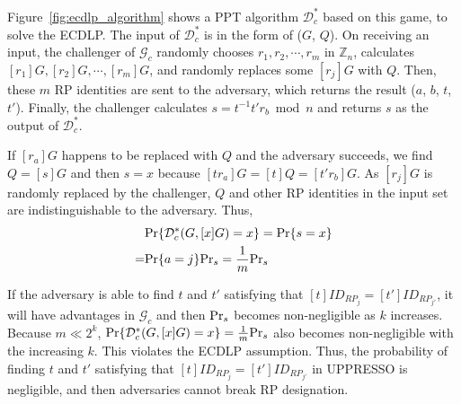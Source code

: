 Figure~\ref{fig:ecdlp_algorithm} shows a PPT algorithm $\mathcal{D}^*_c$ based on this game, to solve the ECDLP.
The input of $\mathcal{D}^*_c$ is in the form of ($G$, $Q$).
On receiving an input, the challenger of $\mathcal{G}_c$ randomly chooses $r_1, r_2, \cdots, r_m$ in $\mathbb{Z}_n$,
 calculates $[r_1]G, [r_2]G, \cdots, [r_m]G$,
 and randomly replaces some $[r_j]G$ with $Q$.
Then,
    these $m$ RP identities are sent to the adversary,
which returns the result ($a$, $b$, $t$, $t'$).
Finally, the challenger calculates $s = t^{-1}t'r_b \bmod n$ and returns $s$ as the output of $\mathcal{D}^*_c$.

If $[r_a]G$ happens to be replaced with $Q$ and the adversary succeeds,
    we find $Q = [s]G$ and then $s=x$ because $[tr_a]G = [t]Q = [t'r_b]G$.
As $[r_j]G$ is randomly replaced by the challenger,
    $Q$ and other RP identities in the input set are indistinguishable to the adversary.
Thus,
\begin{align*}
&{\rm Pr}\{\mathcal{D}^*_c(G, [x]G)=x\} = {\rm Pr}\{s = x\}\\=&{\rm Pr}\{a=j\}{\rm Pr}_s=\frac{1}{m}{\rm Pr}_s
\end{align*}

If the adversary is able to find $t$ and $t'$
    satisfying that $[t]ID_{RP_j} = [t']ID_{RP_{j'}}$,
    it will have advantages in $\mathcal{G}_c$
        and then
         ${\rm Pr}_s$ becomes non-negligible as $k$ increases.
Because $m \ll 2^k$, ${\rm Pr}\{\mathcal{D}^*_c(G, [x]G)=x\} = \frac{1}{m}{\rm Pr}_s$ also
becomes non-negligible with the increasing $k$.
This violates the ECDLP assumption.
Thus, the probability of finding $t$ and $t'$ satisfying that $[t]ID_{RP_j} = [t']ID_{RP_{j'}}$ in UPPRESSO is negligible,
    and then adversaries cannot break RP designation.





